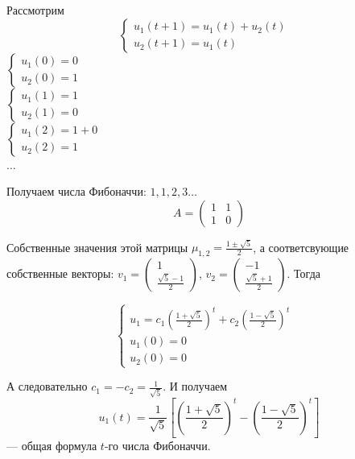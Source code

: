 \begin{example}

Рассмотрим
\begin{equation*}
\begin{cases}
u_1(t+1) = u_1(t) + u_2(t)&\\
u_2(t+1) = u_1(t)&
\end{cases}
\end{equation*}
$
\begin{cases}
u_1(0) = 0&\\
u_2(0) =1&
\end{cases}
$\\
$
\begin{cases}
u_1(1) = 1&\\
u_2(1) = 0&
\end{cases}
$\\
$
\begin{cases}
u_1(2) = 1+0&\\
u_2(2) = 1&
\end{cases}
$\\

$\ldots$

Получаем числа Фибоначчи: $1,1,2,3 \ldots$
\begin{equation*}
A = \begin{pmatrix} 1 & 1 \\ 1 & 0 \end{pmatrix}
\end{equation*}

Собственные значения этой матрицы $\mu_{1,2} = \frac{1 \pm \sqrt{5}}{2}$, а соответсвующие собственные векторы: $v_1 = \begin{pmatrix} 1 \\ \frac{\sqrt{5} - 1}{2} \end{pmatrix}$, $v_2 = \begin{pmatrix} -1 \\ \frac{\sqrt{5} + 1}{2} \end{pmatrix}$. Тогда

\begin{equation*}
\begin{cases}
u_1 = c_1 \left(\frac{1 + \sqrt{5}}{2} \right)^t + c_2 \left(\frac{1 - \sqrt{5}}{2}\right)^t &\\
u_1(0) = 0&\\
u_2(0) = 0&
\end{cases}
\end{equation*}

А следовательно $c_1 = - c_2 = \frac{1}{\sqrt{5}}$. И получаем
\begin{equation*}
u_1(t) = \frac{1}{\sqrt{5}} \left[ \left(\frac{1 + \sqrt{5}}{2} \right)^t - \left(\frac{1 - \sqrt{5}}{2}\right)^t \right]
\end{equation*}
--- общая формула $t$-го числа Фибоначчи.
\end{example}

